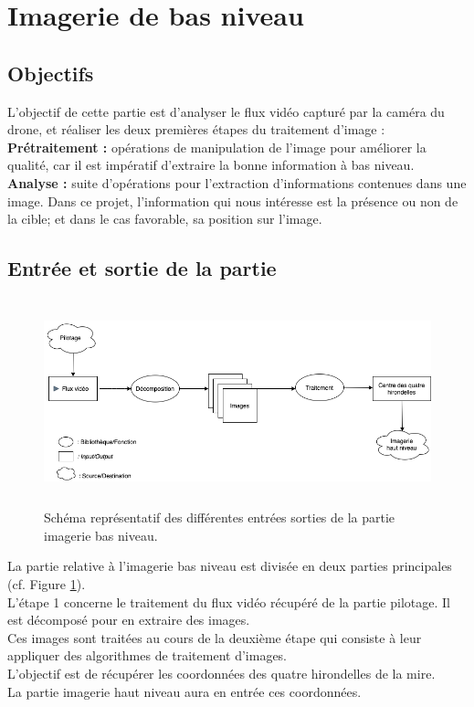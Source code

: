 \documentclass[12pt]{article}
\begin{document}
\section{Imagerie de bas niveau\label{bas}}


\subsection{Objectifs}
L'objectif de cette partie est d'analyser le flux vidéo capturé par la caméra du drone, et réaliser les deux premières étapes du traitement d'image : \\         
\textbf{Prétraitement : }opérations de
manipulation de l'image pour améliorer la
qualité, car il est impératif d'extraire la bonne information à bas niveau.\\
\textbf{Analyse : }suite d'opérations pour l'extraction
d'informations contenues dans une image. Dans ce projet, l'information qui nous intéresse est la présence ou non de la cible; et dans le cas favorable, sa position sur l'image.


\subsection{Entrée et sortie de la partie }
\label{section:Workflow}
 \begin{figure}[H]
\centering
\includegraphics[height=6cm]{workflowG.png}
\caption{Schéma représentatif des différentes entrées sorties de la partie imagerie bas niveau. }
\label{fig:WorkflowG}
\end{figure}


La partie relative à l'imagerie bas niveau est divisée en deux parties principales (cf. Figure \ref{fig:WorkflowG}).\\ L'étape 1 concerne le traitement du flux vidéo récupéré de la partie pilotage. Il est décomposé pour en extraire des images. \\Ces images sont traitées au cours de la deuxième étape qui consiste à leur appliquer des algorithmes de traitement d'images.\\ L'objectif est de récupérer les coordonnées des quatre hirondelles de la mire.\\
La partie imagerie haut niveau aura en entrée ces coordonnées.
\end{document}

